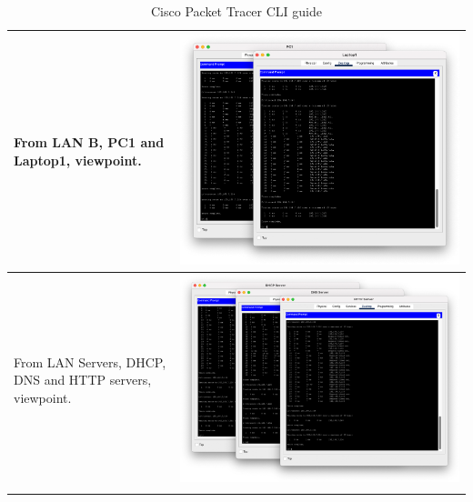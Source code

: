 \documentclass[11pt,a4paper]{report}
\begin{document}
\begin{flushleft}
\begin{center}
\begin{longtable}{ m{5cm} l }
                        From LAN B, PC1 and Laptop1, viewpoint.                                                                                                                                                                             & \includegraphics[scale=0.27 ,valign=c]{lanb-outputall}                \\ \hline
                        From LAN Servers, DHCP, DNS and HTTP servers, viewpoint.                                                                                                                                                            & \includegraphics[scale=0.23 ,valign=c]{lanservers-outputall}          \\ \hline

                        \caption{Cisco Packet Tracer CLI guide}
                        \label{tab:cptg2}
                    \end{longtable}
                \end{center}
        \end{flushleft}
\end{document}
